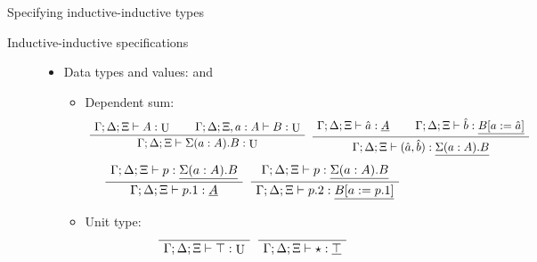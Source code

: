 \documentclass[runningheads]{llncs}
\newenvironment{bprooftree}
  {\leavevmode\hbox\bgroup}
  {\DisplayProof\egroup}
\DeclareMathOperator{\UU}{U}
\newcommand{\tac}{\vdash}
\begin{document}
{\begin{section}{Specifying inductive-inductive types}
\begin{subsection}{Inductive-inductive specifications}
\begin{figure}[htpb]
\begin{itemize}
        \item Data types and values: \hfill \boxed{\Gamma; \Delta; \Xi \tac A : \UU} and \boxed{\Gamma; \Delta; \Xi \tac a : \underline{A}}
        \begin{itemize}
            \item Dependent sum:
            \[
                \begin{bprooftree}
                    \AxiomC{$\Gamma ; \Delta ; \Xi \tac A : \UU$}\AxiomC{$\Gamma ; \Delta ; \Xi , a : A \tac B : \UU$}\BinaryInfC{$\Gamma ; \Delta ; \Xi \tac \Sigma(a : A).B : \UU$}
                \end{bprooftree}
                \begin{bprooftree}
                    \AxiomC{$\Gamma ; \Delta ; \Xi \tac \hat{a} : \underline{A}$}\AxiomC{$\Gamma ; \Delta ; \Xi \tac \hat{b} : \underline{B[a := \hat{a}]}$}\BinaryInfC{$\Gamma ; \Delta ; \Xi \tac (\hat{a} , \hat{b}) : \underline{\Sigma(a : A).B}$}
                \end{bprooftree}
            \]
            \[
                \begin{bprooftree}
                    \AxiomC{$\Gamma ; \Delta ; \Xi \tac p : \underline{\Sigma(a : A).B}$}\UnaryInfC{$\Gamma ; \Delta ; \Xi \tac p .1 : \underline{A}$}
                \end{bprooftree}
                \begin{bprooftree}
                    \AxiomC{$\Gamma ; \Delta ; \Xi \tac p : \underline{\Sigma(a : A).B}$}\UnaryInfC{$\Gamma ; \Delta ; \Xi \tac p .2 : \underline{B[a := p .1]}$}
                \end{bprooftree}
            \]
        
            \item Unit type:
            \[
                \begin{bprooftree}
                    \AxiomC{}\UnaryInfC{$\Gamma ; \Delta ; \Xi \tac \top : \UU$}
                \end{bprooftree}
                \begin{bprooftree}
                    \AxiomC{}\UnaryInfC{$\Gamma ; \Delta ; \Xi \tac \star : \underline{\top}$}
                \end{bprooftree}
            \]
        

\end{itemize}
\end{itemize}
\end{figure}
\end{subsection}
\end{section}}
\end{document}
